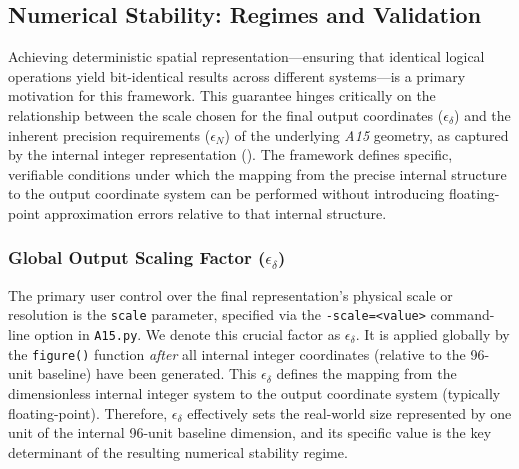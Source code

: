 \documentclass[10pt]{article}
\def\AAAB{\textit{A15}}
\begin{document}
\subsection{Numerical Stability: Regimes and Validation}\label{subsec:stability}

Achieving deterministic spatial representation—ensuring that identical logical operations yield bit-identical results across different systems—is a primary motivation for this framework. This guarantee hinges critically on the relationship between the scale chosen for the final output coordinates ($\epsilon_\delta$) and the inherent precision requirements ($\epsilon_N$) of the underlying \AAAB{} geometry, as captured by the internal integer representation (). The framework defines specific, verifiable conditions under which the mapping from the precise internal structure to the output coordinate system can be performed without introducing floating-point approximation errors relative to that internal structure.

\subsubsection{Global Output Scaling Factor ($\epsilon_\delta$)}\label{subsubsec:stability-epsilon-d}
The primary user control over the final representation's physical scale or resolution is the \texttt{scale} parameter, specified via the \texttt{-scale=<value>} command-line option in \texttt{A15.py}. We denote this crucial factor as $\epsilon_\delta$. It is applied globally by the \texttt{figure()} function \emph{after} all internal integer coordinates (relative to the 96-unit baseline) have been generated. This $\epsilon_\delta$ defines the mapping from the dimensionless internal integer system to the output coordinate system (typically floating-point). Therefore, $\epsilon_\delta$ effectively sets the real-world size represented by one unit of the internal 96-unit baseline dimension, and its specific value is the key determinant of the resulting numerical stability regime.
\end{document}
